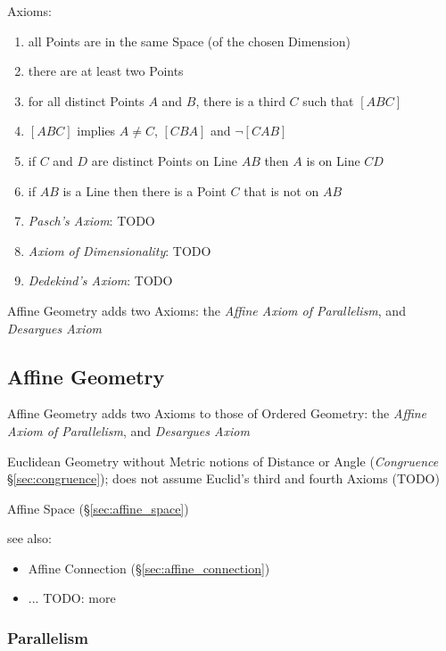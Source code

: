 Axioms:
\begin{enumerate}
  \item all Points are in the same Space (of the chosen Dimension)
  \item there are at least two Points
  \item for all distinct Points $A$ and $B$, there is a third $C$ such that
    $[ABC]$
  \item $[ABC]$ implies $A \neq C$, $[CBA]$ and $\neg[CAB]$
  \item if $C$ and $D$ are distinct Points on Line $AB$ then $A$ is on Line $CD$
  \item if $AB$ is a Line then there is a Point $C$ that is not on $AB$
  \item \emph{Pasch's Axiom}: TODO
  \item \emph{Axiom of Dimensionality}: TODO
  \item \emph{Dedekind's Axiom}: TODO
\end{enumerate}

Affine Geometry adds two Axioms: the \emph{Affine Axiom of Parallelism}, and
\emph{Desargues Axiom}



\subsection{Affine Geometry}\label{sec:affine_geometry}

Affine Geometry adds two Axioms to those of Ordered Geometry: the \emph{Affine
  Axiom of Parallelism}, and \emph{Desargues Axiom}

Euclidean Geometry without Metric notions of Distance or Angle
(\emph{Congruence} \S\ref{sec:congruence}); does not assume Euclid's third and
fourth Axioms (TODO)

\fist Affine Space (\S\ref{sec:affine_space})

see also:
\begin{itemize}
  \item Affine Connection (\S\ref{sec:affine_connection})
  \item ... TODO: more
\end{itemize}



\subsubsection{Parallelism}\label{sec:parallelism}


